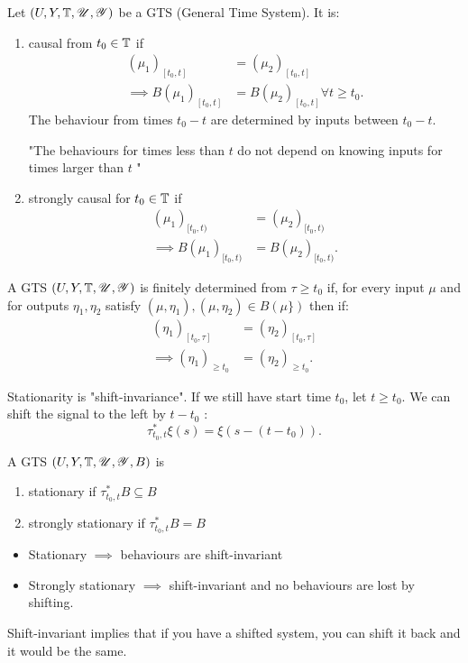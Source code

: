 \begin{definition}
	Let $(U, Y, \mathbb{T}, \mathscr{U}, \mathscr{Y})$ be a GTS (General Time System). It is:
	\begin{enumerate}
		\item causal from $t_{0} \in  \mathbb{T}$ if 
			\begin{align*}
				(\mu _{1})_{[t_{0}, t]} &= (\mu _{2})_{[t_{0}, t]} \\
	\implies	B(\mu _{1})_{[t_{0}, t]} &= B(\mu _{2})_{[t_{0}, t]} \forall  t \ge t_0
			.\end{align*}
		The behaviour from times $t_0 - t$ are determined by inputs between $t_0 - t$. 

		"The behaviours for times less than $t$ do not depend on knowing inputs for times larger than $t$ "

		\item strongly causal for $t_{0} \in  \mathbb{T}$ if 
	\begin{align*}
		(\mu _{1})_{[t_{0}, t)} &= (\mu _{2})_{[t_{0}, t)} \\
\implies		B(\mu _{1})_{[t_{0}, t)} &= B(\mu _{2})_{[t_{0}, t)}
	.\end{align*}
	\end{enumerate}
\end{definition}

\begin{definition}
	A GTS $(U, Y, \mathbb{T}, \mathscr{U}, \mathscr{Y})$ is finitely determined from $\tau \ge t_{0}$ if, for every input $\mu$ and for outputs $\eta_{1}, \eta_{2}$ satisfy $\left( \mu, \eta _{1} \right) , \left( \mu, \eta_{2} \right) \in B\left( \mu \}  \right) $ then if: 
	\begin{align*}
		\left( \eta_{1} \right) _{[t_0, \tau] } &= \left( \eta  _{2} \right)  _{\left[ t_0, \tau  \right] } \\
		\implies \left( \eta _{1} \right) _{\ge t_0} &= \left( \eta    _{2} \right)_{\ge t_0} 
	.\end{align*}
\end{definition}


\begin{definition}
	Stationarity is "shift-invariance". If we still have start time $t_0$, let $t\ge t_0$. We can shift the signal to the left by $t - t_0$ :
	 \[
		 \tau ^{*} _{t_0, t} \xi \left( s \right)  = \xi \left( s - \left( t - t_0 \right)  \right) 	
	.\] 
\end{definition}

\begin{definition}
	A GTS $\left( U, Y, \mathbb{T}, \mathscr{U}, \mathscr{Y}, B \right) $ is 
	\begin{enumerate}
		\item stationary if $\tau  ^* _{t_0, t} B \subseteq B$
		\item strongly stationary if $\tau  ^* _{t_0, t} B = B$
	\end{enumerate}
	\begin{itemize}
		\item Stationary $\implies$ behaviours are shift-invariant
		\item Strongly stationary $\implies$ shift-invariant and no behaviours are lost by shifting. 
	\end{itemize}
\end{definition}

\begin{remark}
	Shift-invariant implies that if you have a shifted system, you can shift it back and it would be the same. 
\end{remark}
